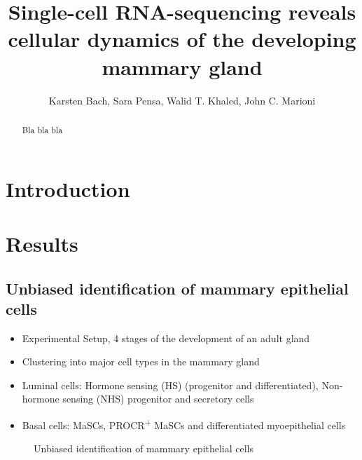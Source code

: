 \documentclass[oneside]{amsart}
\title{Single-cell RNA-sequencing reveals cellular dynamics of the developing mammary gland}
\author{Karsten Bach, Sara Pensa, Walid T. Khaled, John C. Marioni}
\begin{document}
\begin{abstract}
    Bla bla bla
\end{abstract}

\maketitle
\tableofcontents
\newpage
\section{Introduction}

\section{Results}
\subsection{Unbiased identification of mammary epithelial cells\label{sec:cluster}}
\begin{itemize}
    \item Experimental Setup, 4 stages of the development of an adult gland
    \item Clustering into major cell types in the mammary gland
    \item Luminal cells: Hormone sensing (HS) (progenitor and differentiated), Non-hormone sensing (NHS) progenitor and secretory cells
    \item Basal cells: MaSCs, PROCR\textsuperscript{+} MaSCs and differentiated myoepithelial cells
\end{itemize}

\begin{figure}[h]
\begin{subfigure}{0.45\linewidth}
\centering %
\caption{}
\end{subfigure}
\begin{subfigure}{0.45\linewidth}
\caption{}
\end{subfigure}
\begin{subfigure}{0.45\linewidth}
\centering %
\caption{}
\end{subfigure}
    \caption{Unbiased identification of mammary epithelial cells}
      \label{fig:f1}
  \end{figure}
\end{document}
